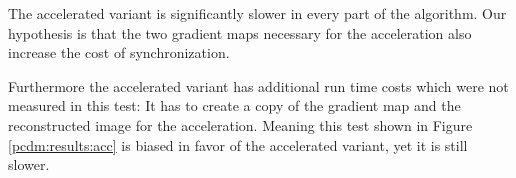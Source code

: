 The accelerated variant is significantly slower in every part of the algorithm. Our hypothesis is that the two gradient maps necessary for the acceleration also increase the cost of synchronization.

Furthermore the accelerated variant has additional run time costs which were not measured in this test: It has to create a copy of the gradient map and the reconstructed image for the acceleration. Meaning this test shown in Figure \ref{pcdm:results:acc} is biased in favor of the accelerated variant, yet it is still slower.

\pagebreak
